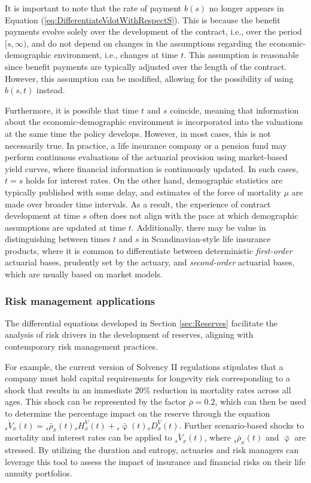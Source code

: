 \documentclass[12pt]{article}
\begin{document}
It is important to note that the rate of payment $b(s)$ no longer appears in Equation (\ref{eq:DifferentiateVdotWithRespectS}). This is because the benefit payments evolve solely over the development of the contract, i.e., over the period $[s, \infty)$, and do not depend on changes in the assumptions regarding the economic-demographic environment, i.e., changes at time $t$. This assumption is reasonable since benefit payments are typically adjusted over the length of the contract. However, this assumption can be modified, allowing for the possibility of using $b(s,t)$ instead.


Furthermore, it is possible that time $t$ and $s$ coincide, meaning that information about the economic-demographic environment is incorporated into the valuations at the same time the policy develops. However, in most cases, this is not necessarily true. In practice, a life insurance company or a pension fund may perform continuous evaluations of the actuarial provision using market-based yield curves, where financial information is continuously updated. In such cases, $t = s$ holds for interest rates. On the other hand, demographic statistics are typically published with some delay, and estimates of the force of mortality $\mu$ are made over broader time intervals. As a result, the experience of contract development at time $s$ often does not align with the pace at which demographic assumptions are updated at time $t$. Additionally, there may be value in distinguishing between times $t$ and $s$ in Scandinavian-style life insurance products, where it is common to differentiate between deterministic \textit{first-order} actuarial bases, prudently set by the actuary, and \textit{second-order} actuarial bases, which are usually based on market models.




\subsubsection{Risk management applications}

The differential equations developed in Section \ref{sec:Reserves} facilitate the analysis of risk drivers in the development of reserves, aligning with contemporary risk management practices.

For example, the current version of Solvency II regulations stipulates that a company must hold capital requirements for longevity risk corresponding to a shock that results in an immediate 20\% reduction in mortality rates across all ages. This shock can be represented by the factor $\bar{\rho} = 0.2$, which can then be used to determine the percentage impact on the reserve through the equation ${}_s\acute{V}_x(t) = {}_s\bar{\rho}_x(t) {}_sH_x^V(t) + {}_s\bar{\upvarphi}(t) {}_sD_x^V(t)$. Further scenario-based shocks to mortality and interest rates can be applied to ${}_s\acute{V}_x(t)$, where ${}_s\bar{\rho}_x(t)$ and $\bar{\upvarphi}$ are stressed. By utilizing the duration and entropy, actuaries and risk managers can leverage this tool to assess the impact of insurance and financial risks on their life annuity portfolios.
\end{document}

